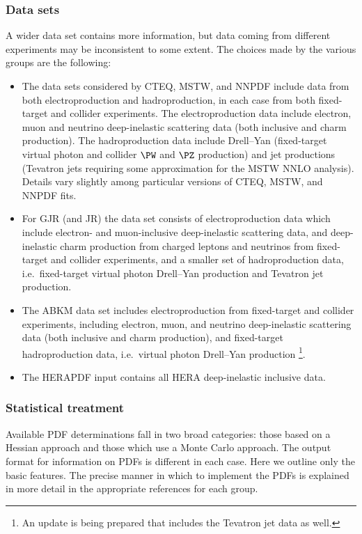 \subsubsection{Data sets}
\label{data}
A wider data set contains more information, but data coming
from different experiments may be inconsistent to some extent. The
choices made by the various groups are the following:
\begin{itemize}
\item The data sets considered by CTEQ, MSTW, and NNPDF include data from both  
electroproduction 
and hadroproduction, in each case from both
  fixed-target and collider experiments. The electroproduction data
  include electron, muon and neutrino  
 deep-inelastic scattering data (both inclusive and charm
 production). The hadroproduction data include Drell--Yan (fixed-target
 virtual photon and collider $\PW$ and $\PZ$ production) and jet
 productions (Tevatron jets requiring some approximation for the MSTW NNLO
analysis). 
Details vary slightly among particular versions of CTEQ, MSTW, and NNPDF 
fits. 
\item For GJR (and JR) the data set consists of electroproduction data 
which include electron- and muon-inclusive
 deep-inelastic scattering data, and deep-inelastic charm 
 production from charged leptons and neutrinos from
  fixed-target and collider experiments, and a smaller set of 
hadroproduction data, i.e.\ fixed-target virtual photon Drell--Yan 
production and  Tevatron jet production.
\item The ABKM data set includes electroproduction  from
  fixed-target and collider experiments, including electron, 
muon, and neutrino deep-inelastic scattering data (both inclusive and charm
 production), and fixed-target hadroproduction data, i.e.\ virtual
 photon Drell--Yan production%
\footnote{An update is being prepared that includes the Tevatron jet data as well.}. 
\item The HERAPDF input contains all HERA deep-inelastic inclusive
data.   
\end{itemize}

\subsubsection{Statistical treatment}
\label{stat}

Available PDF determinations fall in two broad categories: those
based on a Hessian approach and those which use a Monte Carlo
approach. The output format for information on PDFs is different in 
each case. Here we  outline only the basic features. The precise manner 
in which to implement the PDFs 
is explained in more detail in the appropriate 
references for each group. 

